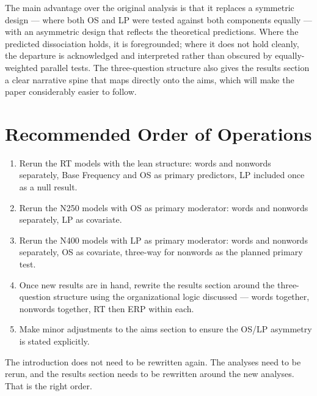 \documentclass[12pt]{article}
\begin{document}
	The main advantage over the original analysis is that it replaces a symmetric design --- where both OS and LP were tested against both components equally --- with an asymmetric design that reflects the theoretical predictions. Where the predicted dissociation holds, it is foregrounded; where it does not hold cleanly, the departure is acknowledged and interpreted rather than obscured by equally-weighted parallel tests. The three-question structure also gives the results section a clear narrative spine that maps directly onto the aims, which will make the paper considerably easier to follow.
	
	\section{Recommended Order of Operations}
	
	\begin{enumerate}
		\item Rerun the RT models with the lean structure: words and nonwords separately, Base Frequency and OS as primary predictors, LP included once as a null result.
		\item Rerun the N250 models with OS as primary moderator: words and nonwords separately, LP as covariate.
		\item Rerun the N400 models with LP as primary moderator: words and nonwords separately, OS as covariate, three-way for nonwords as the planned primary test.
		\item Once new results are in hand, rewrite the results section around the three-question structure using the organizational logic discussed --- words together, nonwords together, RT then ERP within each.
		\item Make minor adjustments to the aims section to ensure the OS/LP asymmetry is stated explicitly.
	\end{enumerate}
	
	The introduction does not need to be rewritten again. The analyses need to be rerun, and the results section needs to be rewritten around the new analyses. That is the right order.
	
\end{document}
